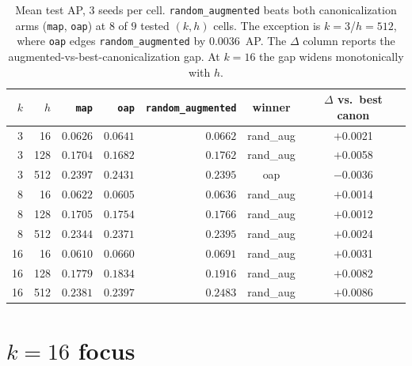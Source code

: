 \documentclass[11pt]{article}
\newcommand{\win}{\cellcolor{green!18}}
\newcommand{\tie}{\cellcolor{gray!10}}
\begin{document}
\begin{table}[h]
\centering\small
\setlength{\tabcolsep}{6pt}
\begin{tabular}{r r r r r c c}
\toprule
$k$  &  $h$  & \texttt{map}    & \texttt{oap}    & \texttt{random\_augmented} & winner & $\Delta$ vs.\ best canon \\
\midrule
 3   &   16  & $0.0626$        & $0.0641$        & \win \textbf{$0.0662$}      & rand\_aug & $+$0.0021 \\
 3   &  128  & $0.1704$        & $0.1682$        & \win \textbf{$0.1762$}      & rand\_aug & $+$0.0058 \\
 3   &  512  & $0.2397$        & \tie $0.2431$   & $0.2395$                    & oap       & $-$0.0036 \\
\midrule
 8   &   16  & $0.0622$        & $0.0605$        & \win \textbf{$0.0636$}      & rand\_aug & $+$0.0014 \\
 8   &  128  & $0.1705$        & $0.1754$        & \win \textbf{$0.1766$}      & rand\_aug & $+$0.0012 \\
 8   &  512  & $0.2344$        & $0.2371$        & \win \textbf{$0.2395$}      & rand\_aug & $+$0.0024 \\
\midrule
16   &   16  & $0.0610$        & $0.0660$        & \win \textbf{$0.0691$}      & rand\_aug & $+$0.0031 \\
16   &  128  & $0.1779$        & $0.1834$        & \win \textbf{$0.1916$}      & rand\_aug & $+$0.0082 \\
16   &  512  & $0.2381$        & $0.2397$        & \win \textbf{$0.2483$}      & rand\_aug & $+$0.0086 \\
\bottomrule
\end{tabular}
\caption{Mean test AP, $3$ seeds per cell. \texttt{random\_augmented}
beats both canonicalization arms (\texttt{map}, \texttt{oap}) at $8$ of
$9$ tested $(k,h)$ cells. The exception is $k\!=\!3$/$h\!=\!512$, where
\texttt{oap} edges \texttt{random\_augmented} by $0.0036$~AP. The
$\Delta$ column reports the augmented-vs-best-canonicalization gap.
At $k\!=\!16$ the gap widens monotonically with $h$.}
\label{tab:headline}
\end{table}

\section{$k\!=\!16$ focus}
\end{document}
